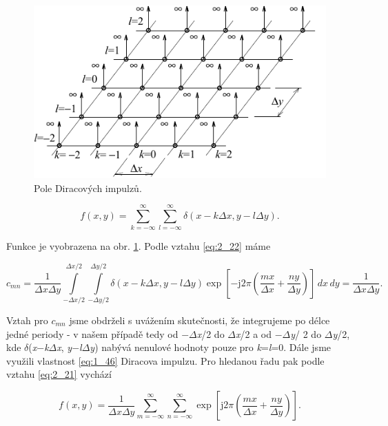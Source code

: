 \begin{figure}[th]
    \begin{center}
        \includegraphics[scale=1.0]{02_transformace/images/img_2_1.pdf}
    \end{center}
    \caption{Pole Diracových impulzů.}
    \label{img:2_1}
\end{figure}

\begin{equation}
    f(x, y) = \sum\limits_{k=-\infty}^{\infty} \sum\limits_{l=-\infty}^{\infty} \delta( x - k\Delta x, y - l\Delta y ).\nonumber
\end{equation}

Funkce je vyobrazena na obr. \ref{img:2_1}. Podle vztahu \eqref{eq:2_22} máme

\begin{equation}
    c_{mn} = \frac{1}{\Delta x \Delta y} \int\limits_{-\Delta x/2}^{\Delta x/2} \int\limits_{-\Delta y/2}^{\Delta y/2} \delta(x - k\Delta x, y - l\Delta y) \exp \left[ - \mathrm{j} 2 \pi \left( \frac{mx}{\Delta x} + \frac{ny}{\Delta y} \right) \right]\,dx\,dy = \frac{1}{\Delta x \Delta y}.\nonumber
\end{equation}

Vztah pro $c_{mn}$ jsme obdrželi s uvážením skutečnosti, že integrujeme po délce jedné periody - v našem případě tedy od $-$$\Delta$\textit{x}/2 do $\Delta$\textit{x}/2  a od  $-$$\Delta$\textit{y}/ 2 do $\Delta$\textit{y}/2, kde $\delta$(\textit{x}$-$\textit{k}$\Delta$\textit{x}, \textit{y}$-$\textit{l}$\Delta$\textit{y}) nabývá nenulové hodnoty pouze pro \textit{k}=\textit{l}=0. Dále jsme využili vlastnost \eqref{eq:1_46} Diracova impulzu. Pro hledanou řadu pak podle vztahu \eqref{eq:2_21} vychází

\begin{equation}
    f(x, y) = \frac{1}{\Delta x \Delta y} \sum\limits_{m=-\infty}^{\infty} \sum\limits_{n=-\infty}^{\infty} \exp \left[ \mathrm{j} 2 \pi \left( \frac{mx}{\Delta x} + \frac{ny}{\Delta y} \right) \right].\nonumber
\end{equation}


